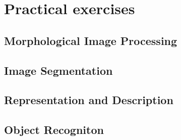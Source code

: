 \section{Practical exercises}
\subsection{Morphological Image Processing}

\subsection{Image Segmentation}




\subsection{Representation and Description}




\subsection{Object Recogniton}